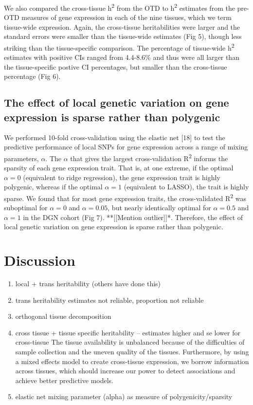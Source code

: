 \documentclass[]{article}
\begin{document}
We also compared the cross-tissue h\textsuperscript{2} from the OTD to
h\textsuperscript{2} estimates from the pre-OTD measures of gene
expression in each of the nine tissues, which we term tissue-wide
expression. Again, the cross-tissue heritabilities were larger and the
standard errors were smaller than the tissue-wide estimates (Fig 5),
though less striking than the tissue-specific comparison. The percentage
of tissue-wide h\textsuperscript{2} estimates with positive CIs ranged
from 4.4-8.6\% and thus were all larger than the tissue-specific postive
CI percentages, but smaller than the cross-tissue percentage (Fig 6).

\subsection{The effect of local genetic variation on gene expression is
sparse rather than
polygenic}\label{the-effect-of-local-genetic-variation-on-gene-expression-is-sparse-rather-than-polygenic}

We performed 10-fold cross-validation using the elastic net {[}18{]} to
test the predictive performance of local SNPs for gene expression across
a range of mixing parameters, \(\alpha\). The \(\alpha\) that gives the
largest cross-validation R\textsuperscript{2} informs the sparsity of
each gene expression trait. That is, at one extreme, if the optimal
\(\alpha=0\) (equivalent to ridge regression), the gene expression trait
is highly polygenic, whereas if the optimal \(\alpha=1\) (equivalent to
LASSO), the trait is highly sparse. We found that for most gene
expression traits, the cross-validated R\textsuperscript{2} was
suboptimal for \(\alpha=0\) and \(\alpha=0.05\), but nearly identically
optimal for \(\alpha=0.5\) and \(\alpha=1\) in the DGN cohort (Fig 7).
**{[}{[}Mention outlier{]}{]}*. Therefore, the effect of local genetic
variation on gene expression is sparse rather than polygenic.

\section{Discussion}\label{discussion}

\begin{enumerate}
\def\labelenumi{\arabic{enumi}.}
\itemsep1pt\parskip0pt
\item
  local + trans heritability (others have done this)
\item
  trans heritability estimates not reliable, proportion not reliable
\item
  orthogonal tissue decomposition
\item
  cross tissue + tissue specific heritability -- estimates higher and se
  lower for cross-tissue The tissue availability is unbalanced because
  of the difficulties of sample collection and the uneven quality of the
  tissues. Furthermore, by using a mixed effects model to create
  cross-tissue expression, we borrow information across tissues, which
  should increase our power to detect associations and achieve better
  predictive models.
\item
  elastic net mixing parameter (alpha) as measure of
  polygenicity/sparsity
\end{enumerate}
\end{document}
